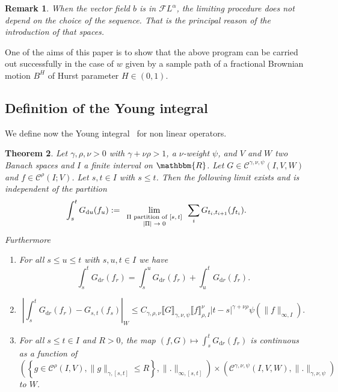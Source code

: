\documentclass[a4paper,11pt]{article}
\newcommand{\assign}{:=}
\newcommand{\mathd}{\mathrm{d}}
\newcommand{\tmscript}[1]{\text{\scriptsize{$#1$}}}
\newtheorem{theorem}{Theorem}[section]
\newtheorem{remark}[theorem]{Remark}
\newcommand{\CC}{\mathscr C}
\newcommand{\CF}{\mathscr F}
\begin{document}
\begin{remark}
  When the vector field $b$ is in $\CF L^{\alpha}$, the limiting procedure
  does not depend on the choice of the sequence. That is the principal reason
  of the introduction of that spaces.
\end{remark}

One of the aims of this paper is to show that the above program can be carried
out successfully in the case of $w$ given by a sample path of a fractional
Brownian motion $B^{H}$ of Hurst parameter $H \in (0,1)$.

\subsection{Definition of the Young integral}

We define now the Young integral~{\cite{Young,Lyons,controlling}} for non
linear operators.

\begin{theorem}
  \label{theorem:young integral}Let $\gamma , \rho , \nu >0$ with $\gamma +
  \nu \rho >1$, a $\nu$-weight $\psi$, and $V$ and $W$ two Banach spaces and
  $I$ a finite interval on $\mathbbm{R}$. Let $G \in \CC^{\gamma , \nu , \psi}
  ( I,V,W )$ and $f \in \CC^{\rho} (I;V)$. Let $s,t \in I$ with $s \leqslant
  t$. Then the following limit exists and is independent of the partition
  \[ \int_{s}^{t} G_{\mathd u} (f_{u} ) \assign
     \lim_{\tmscript{\begin{array}{c}
         \text{$\Pi$ partition of $[s,t]$}\\
       | \Pi | \to 0
     \end{array}}}   \sum_{i} G_{t_{i} ,t_{i+1}} (f_{t_{i}} )
. \]
  Furthermore
  \begin{enumerate}
    \item For all $s \leqslant u \leqslant t$ with $s,u,t \in I$ we have
    \[ \int_{s}^{t} G_{\mathd r} (f_{r} ) = \int_{s}^{u} G_{\mathd r} (f_{r} )
       + \int_{u}^{t} G_{\mathd r} (f_{r} ) . \]
    \item
    \[ \left\lvert \int_{s}^{t} G_{\mathd r} (f_{r} )-G_{s,t} (f_{s} ) \right\lvert_{W}
       \leqslant C_{\gamma , \rho , \nu} \llbracket G \rrbracket_{\gamma , \nu
       , \psi} \llbracket f \rrbracket_{\rho ,I}^{\nu}  |t-s|^{\gamma + \nu
       \rho} \psi ( \| f \|_{\infty ,I} ) . \]
    \item For all $s \leqslant t \in I$ and $R>0$, the map $(f,G) \mapsto
    \int_{s}^{t} G_{\mathd r} (f_{r} )$ is continuous as a function of $\left(
    \left\{ g \in \CC^{\rho} (I,V), \| g \|_{\gamma , [ s,t ]} \leqslant R
    \right\} ,\|.\|_{\infty ,[s,t]} \right) \times ( \CC^{\gamma , \nu , \psi} (
    I,V,W ) ,\|.\|_{\gamma , \nu , \psi} )$ to $W$.
  \end{enumerate}
\end{theorem}
\end{document}
